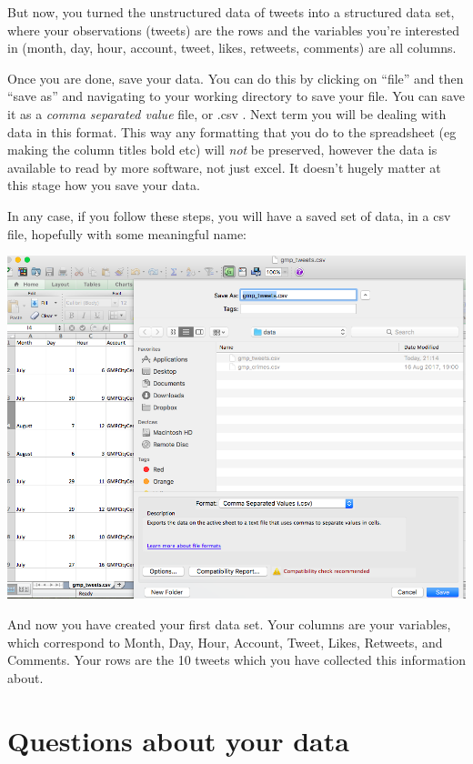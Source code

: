 \documentclass[]{book}
\theoremstyle{definition}
\theoremstyle{definition}
\theoremstyle{definition}
\theoremstyle{remark}
\begin{document}
But now, you turned the unstructured data of tweets into a structured
data set, where your observations (tweets) are the rows and the
variables you're interested in (month, day, hour, account, tweet, likes,
retweets, comments) are all columns.

Once you are done, save your data. You can do this by clicking on
``file'' and then ``save as'' and navigating to your working directory
to save your file. You can save it as a \emph{comma separated value}
file, or .csv . Next term you will be dealing with data in this format.
This way any formatting that you do to the spreadsheet (eg making the
column titles bold etc) will \emph{not} be preserved, however the data
is available to read by more software, not just excel. It doesn't hugely
matter at this stage how you save your data.

In any case, if you follow these steps, you will have a saved set of
data, in a csv file, hopefully with some meaningful name:

\includegraphics{imgs/save_tweets.png}

And now you have created your first data set. Your columns are your
variables, which correspond to Month, Day, Hour, Account, Tweet, Likes,
Retweets, and Comments. Your rows are the 10 tweets which you have
collected this information about.

\hypertarget{questions-about-your-data}{%
\section{Questions about your data}\label{questions-about-your-data}}
\end{document}
